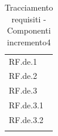\begin{longtable}{|>{\centering}p{3cm}|}
    \hline
    \multicolumn{1}{|c|}{\textbf{Requisiti}} \\ %
      \hline
        RF.de.1 \tabularnewline \hline
		RF.de.2 \tabularnewline \hline
		RF.de.3 \tabularnewline \hline
		RF.de.3.1 \tabularnewline \hline
		RF.de.3.2 \tabularnewline \hline
    \caption{Tracciamento requisiti - Componenti incremento4}
    \label{tab:Tracciamento requisiti - Componenti incremento4}
\end{longtable}